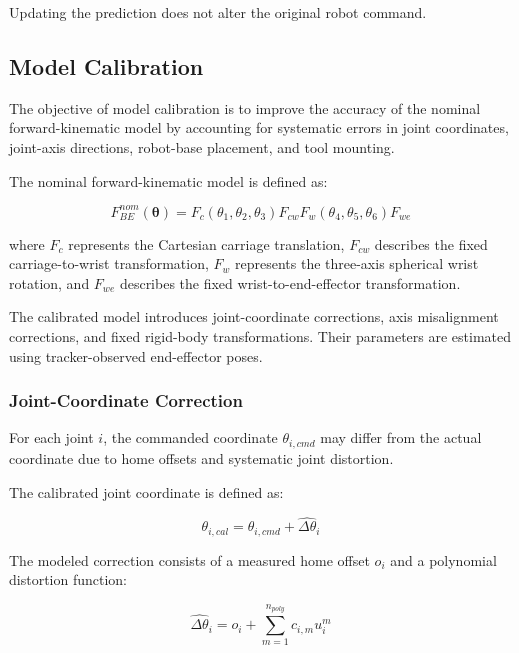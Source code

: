 \documentclass[11pt,letterpaper]{article}
\begin{document}
Updating the prediction does not alter the original
robot command.


\subsection{Model Calibration}

The objective of model calibration is to improve the accuracy
of the nominal forward-kinematic model by accounting for
systematic errors in joint coordinates, joint-axis directions,
robot-base placement, and tool mounting.

The nominal forward-kinematic model is defined as:

\begin{equation}
F_{BE}^{nom}(\boldsymbol{\theta})
=
F_c(\theta_1,\theta_2,\theta_3)
F_{cw}
F_w(\theta_4,\theta_5,\theta_6)
F_{we}
\end{equation}

where $F_c$ represents the Cartesian carriage translation,
$F_{cw}$ describes the fixed carriage-to-wrist transformation,
$F_w$ represents the three-axis spherical wrist rotation,
and $F_{we}$ describes the fixed wrist-to-end-effector
transformation.

The calibrated model introduces joint-coordinate corrections,
axis misalignment corrections, and fixed rigid-body
transformations. Their parameters are estimated using
tracker-observed end-effector poses.

\subsubsection{Joint-Coordinate Correction}

For each joint $i$, the commanded coordinate
$\theta_{i,cmd}$ may differ from the actual coordinate
due to home offsets and systematic joint distortion.

The calibrated joint coordinate is defined as:

\begin{equation}
\boxed{
\theta_{i,cal}
=
\theta_{i,cmd}
+
\widehat{\Delta\theta}_i
}
\end{equation}

The modeled correction consists of a measured home offset
$o_i$ and a polynomial distortion function:

\begin{equation}
\widehat{\Delta\theta}_i
=
o_i+
\sum_{m=1}^{n_{poly}}c_{i,m}u_i^m
\end{equation}
\end{document}
